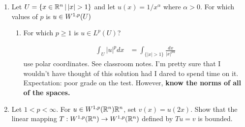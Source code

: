 \documentclass[12pt,a4paper]{report}
\begin{document}
\begin{enumerate}
	\newpage
	\item Let $U = \{x \in \R^n\,|\, |x|>1\}$ and let $u(x) = 1/x^\alpha$ where $\alpha > 0$.  For which values of $p$ is $u \in {W^{1,p}(U)}$
	
	\begin{enumerate}
		\item For which $p\ge 1$ is $u \in L^p(U)$?
		
		\begin{align*}
			\int_U |u|^p dx &= \int_{\{|x|>1\}} \frac{dx}{|x|^{p\alpha}}
		\end{align*}use polar coordinates.  See classroom notes.  I'm pretty sure that I wouldn't have thought of this solution had I dared to spend time on it.  Expectation: poor grade on the test.  However, \textbf{know the norms of all of the spaces.}
	\end{enumerate}
	
	\newpage
	\item Let $1 < p < \infty$. For $u \in W^{1,p}(\mathbb{R}^n){\mathbb{R}^n}$, set $v(x)=u(2x)$.  Show that the linear mapping $T: W^{1,p}(\mathbb{R}^n) \to W^{1,p}(\mathbb{R}^n) $ defined by $Tu=v$ is bounded.
\end{enumerate}
\end{document}
